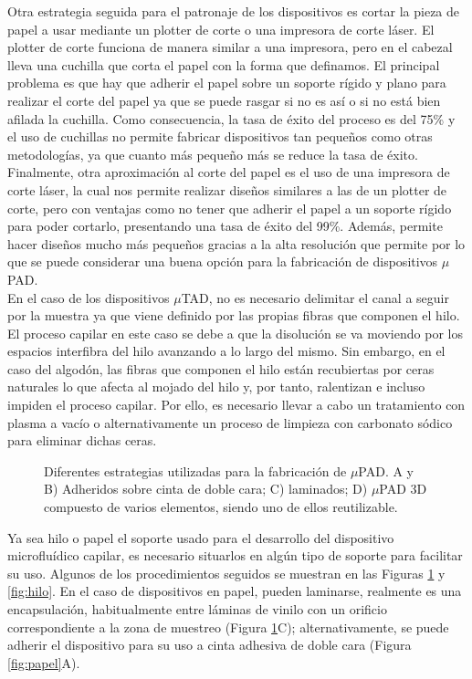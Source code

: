\documentclass{article}
\begin{document}
Otra estrategia seguida para el patronaje de los dispositivos es cortar la pieza de papel a usar mediante un plotter de corte o una impresora de corte láser. El plotter de corte funciona de manera similar a una impresora, pero en el cabezal lleva una cuchilla que corta el papel con la forma que definamos. El principal problema es que hay que adherir el papel sobre un soporte rígido y plano para realizar el corte del papel ya que se puede rasgar si no es así o si no está bien afilada la cuchilla. Como consecuencia, la tasa de éxito del proceso es del 75\% y el uso de cuchillas no permite fabricar dispositivos tan pequeños como otras metodologías, ya que cuanto más pequeño más se reduce la tasa de éxito.\\ 

Finalmente, otra aproximación al corte del papel es el uso de una impresora de corte láser, la cual nos permite realizar diseños similares a las de un plotter de corte, pero con ventajas como no tener que adherir el papel a un soporte rígido para poder cortarlo, presentando una tasa de éxito del 99\%. Además, permite hacer diseños mucho más pequeños gracias a la alta resolución que permite por lo que se puede considerar una buena opción para la fabricación de dispositivos $\mu$PAD. \\

En el caso de los dispositivos $\mu$TAD, no es necesario delimitar el canal a seguir por la muestra ya que viene definido por las propias fibras que componen el hilo. El proceso capilar en este caso se debe a que la disolución se va moviendo por los espacios interfibra del hilo avanzando a lo largo del mismo. Sin embargo, en el caso del algodón, las fibras que componen el hilo están recubiertas por ceras naturales lo que afecta al mojado del hilo y, por tanto, ralentizan e incluso impiden el proceso capilar. Por ello, es necesario llevar a cabo un tratamiento con plasma a vacío o alternativamente un proceso de limpieza con carbonato sódico para eliminar dichas ceras\cite{Nilghaz2013}.\\

\begin{figure}[h]
\caption{Diferentes estrategias utilizadas para la fabricación de $\mu$PAD. A y B) Adheridos sobre cinta de doble cara; C) laminados; D) $\mu$PAD 3D compuesto de varios elementos, siendo uno de ellos reutilizable. }
\label{fig:moneda}
\end{figure}

Ya sea hilo o papel el soporte usado para el desarrollo del dispositivo microfluídico capilar, es necesario situarlos en algún tipo de soporte para facilitar su uso. Algunos de los procedimientos seguidos se muestran en las Figuras \ref{fig:moneda} y \ref{fig:hilo}. En el caso de dispositivos en papel, pueden laminarse, realmente es una encapsulación, habitualmente entre láminas de vinilo con un orificio correspondiente a la zona de muestreo (Figura \ref{fig:moneda}C); alternativamente, se puede adherir el dispositivo para su uso a cinta adhesiva de doble cara (Figura \ref{fig:papel}A). \\
\end{document}
